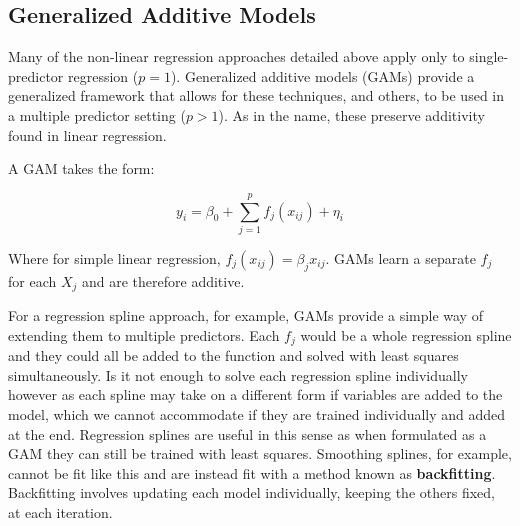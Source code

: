 \subsection{Generalized Additive Models}

Many of the non-linear regression approaches detailed above apply only to single-predictor regression ($p=1$). Generalized additive models (GAMs) provide a generalized framework that allows for these techniques, and others, to be used in a multiple predictor setting ($p>1$). As in the name, these preserve additivity found in linear regression.

A GAM takes the form:

$$ y_{i} = \beta_{0} + \sum^{p}_{j=1}f_{j}(x_{ij}) + \eta_{i} $$

Where for simple linear regression, $f_{j}(x_{ij}) = \beta_{j}x_{ij}$. GAMs learn a separate $f_{j}$ for each $X_{j}$ and are therefore additive.

For a regression spline approach, for example, GAMs provide a simple way of extending them to multiple predictors. Each $f_{j}$ would be a whole regression spline and they could all be added to the function and solved with least squares simultaneously. Is it not enough to solve each regression spline individually however as each spline may take on a different form if variables are added to the model, which we cannot accommodate if they are trained individually and added at the end. Regression splines are useful in this sense as when formulated as a GAM they can still be trained with least squares. Smoothing splines, for example, cannot be fit like this and are instead fit with a method known as \textbf{backfitting}. Backfitting involves updating each model individually, keeping the others fixed, at each iteration.
